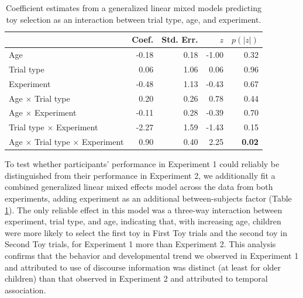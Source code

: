 \documentclass[man]{apa2}
\begin{document}
  \begin{table} [t]
   \caption{Coefficient estimates from a generalized linear mixed models predicting toy selection as an interaction between trial type, age, and experiment.
   \label{tab:coefficient_estimates_full} } 
   \begin{center} 
     \begin{tabular}{lrrrr} 
       \hline 
       \null  & Coef. & Std. Err. & $z$  &  $p(|z|)$ \\
       \hline  
        Age                                                                     & -0.18 &  0.18 & -1.00 & 0.32 \\
        Trial type                                                            & 0.06 &1.06 &  0.06 & 0.96 \\
        Experiment                                                         & -0.48 & 1.13 &  -0.43 & 0.67 \\
        Age $\times$ Trial type                                      & 0.20 & 0.26 & 0.78 & 0.44\\ 
        Age $\times$ Experiment                                   & -0.11 & 0.28 & -0.39 & 0.70\\ 
        Trial type $\times$ Experiment                          & -2.27 & 1.59 & -1.43 & 0.15 \\ 
        Age $\times$ Trial type $\times$ Experiment    & 0.90 & 0.40 & 2.25 & {\bf 0.02} \\ 
       \hline 
     \end{tabular} 
  \end{center}
 \end{table}
 
To test whether participants' performance in Experiment 1 could reliably be distinguished from their performance in Experiment 2, we additionally fit a combined generalized linear mixed effects model across the data from both experiments, adding experiment as an additional between-subjects factor (Table \ref{tab:coefficient_estimates_full}).  The only reliable effect in this model was a three-way interaction between experiment, trial type, and age, indicating that, with increasing age, children were more likely to select the first toy in First Toy trials and the second toy in Second Toy trials, for Experiment 1 more than Experiment 2. This analysis confirms that the behavior and developmental trend we observed in Experiment 1 and attributed to use of discourse information was distinct (at least for older children) than that observed in Experiment 2 and attributed to temporal association.
\end{document}
